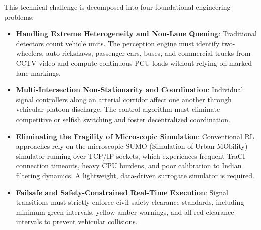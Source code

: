 \documentclass[12pt,a4paper,oneside]{report}
\begin{document}
This technical challenge is decomposed into four foundational engineering problems:
\begin{itemize}
    \item \textbf{Handling Extreme Heterogeneity and Non-Lane Queuing}: Traditional detectors count vehicle units. The perception engine must identify two-wheelers, auto-rickshaws, passenger cars, buses, and commercial trucks from CCTV video and compute continuous PCU loads without relying on marked lane markings.
    \item \textbf{Multi-Intersection Non-Stationarity and Coordination}: Individual signal controllers along an arterial corridor affect one another through vehicular platoon discharge. The control algorithm must eliminate competitive or selfish switching and foster decentralized coordination.
    \item \textbf{Eliminating the Fragility of Microscopic Simulation}: Conventional RL approaches rely on the microscopic SUMO (Simulation of Urban MObility) simulator running over TCP/IP sockets, which experiences frequent TraCI connection timeouts, heavy CPU burdens, and poor calibration to Indian filtering dynamics. A lightweight, data-driven surrogate simulator is required.
    \item \textbf{Failsafe and Safety-Constrained Real-Time Execution}: Signal transitions must strictly enforce civil safety clearance standards, including minimum green intervals, yellow amber warnings, and all-red clearance intervals to prevent vehicular collisions.
\end{itemize}
\end{document}
